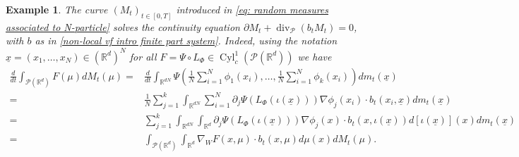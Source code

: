 \documentclass[10pt,leqno]{amsart}
\numberwithin{equation}{section}
\newtheorem{es}[teorema]{Example}
\newcommand{\R}{\mathbb{R}}
\newcommand{\PP}{\mathcal{P}}
\begin{document}
\begin{es}\label{example: N particles CERM}
    The curve $(M_t)_{t\in [0,T]}$ introduced in \eqref{eq: random measures associated to N-particle} solves the continuity equation $\partial M_t+\operatorname{div}_\PP(b_tM_t)=0$, with $b$ as in \eqref{non-local vf intro finite part system}. Indeed, using the notation $\underline{x} = (x_1,\dots,x_N)\in (\R^{d})^N$ for all $F = \Psi
    \circ L_{\Phi} \in \operatorname{Cyl}_c^1(\PP(\R^d))$ we have
    \begin{align*}
        \frac{d}{dt}\int_{\PP(\R^d)} F(\mu) dM_t(\mu)
        = &
        \frac{d}{dt} \int_{\R^{dN}} \Psi \left( \frac{1}{N} \sum_{i=1}^N \phi_1(x_i) , \dots, \frac{1}{N} \sum_{i=1}^N \phi_k(x_i)\right) dm_t(\underline{x})
        \\
        = &
        \frac{1}{N}\sum_{j=1}^k \int_{\R^{dN}} \sum_{i=1}^N \partial_j \Psi\left( L_{\Phi}(\iota(\underline{x})) \right) \nabla \phi_j(x_i)\cdot b_t(x_i,\underline{x}) dm_t(\underline{x})
        \\
        = &
        \sum_{j=1}^k \int_{\R^{dN}} \int_{\R^d} \partial_j \Psi(L_\Phi(\iota(\underline{x}))) \nabla\phi_j(x) \cdot b_t(x,\iota(\underline{x})) d[\iota(\underline{x})](x) dm_t(\underline{x})
        \\
        = & 
        \int_{\PP(\R^d)} \int_{\R^d}  \nabla_W F(x,\mu) \cdot b_t(x,\mu) d\mu(x) dM_t(\mu).
    \end{align*}
\end{es}
\end{document}
